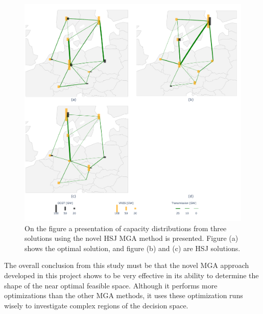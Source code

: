 \begin{figure}[h]\centering
	\includegraphics[width=1.\textwidth,trim={0 0cm 0 0cm},clip]{./Images/HSJ}
	\caption{On the figure a presentation of capacity distributions from three solutions using the novel HSJ MGA method is presented. Figure (a) shows the optimal solution, and figure (b) and (c) are HSJ solutions. }
	\label{fig:HSJ_results}
\end{figure}

The overall conclusion from this study must be that the novel MGA approach developed in this project shows to be very effective in its ability to determine the shape of the near optimal feasible space. Although it performs more optimizations than the other MGA methods, it uses these optimization runs wisely to investigate complex regions of the decision space. 


